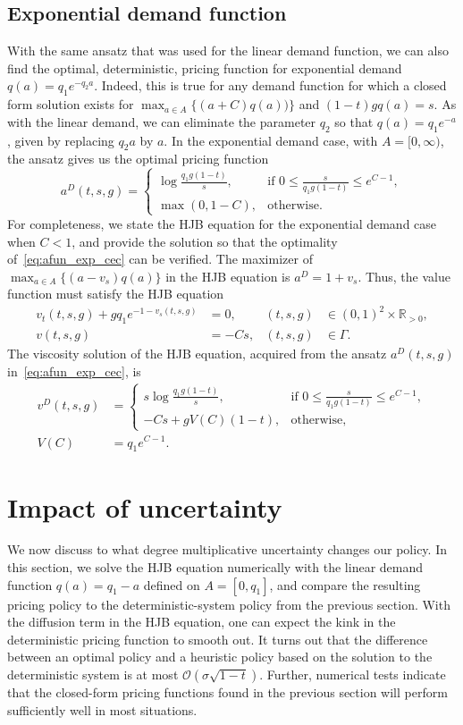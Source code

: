 \documentclass[main.tex]{subfiles}
\begin{document}
\subsection{Exponential demand function}
With the same ansatz that was used for the linear demand function, we
can also find the optimal, deterministic, pricing function for
exponential demand $q(a)=q_1e^{-q_2a}$.
Indeed, this is true for any demand function for which a closed form
solution exists for $\max_{a\in A}\{(a+C)q(a))\}$ and $(1-t)gq(a)=s$.
As with the linear demand, we can eliminate the parameter $q_2$ so that
$q(a)=q_1e^{-a}$, given by replacing $q_2a$ by $a$.
In the exponential demand case, with $A=[0,\infty)$, the ansatz gives
us the optimal pricing function
\begin{equation}\label{eq:afun_exp_cec}
  a^D(t,s,g)=\begin{cases}
    \log{\frac{q_1g(1-t)}{s}},
    &\text{if } 0\leq\frac{s}{q_1g(1-t)}\leq e^{C-1},\\
    \max\left(0,1-C\right),&\text{otherwise}.
  \end{cases}
\end{equation}
For completeness, we state the HJB equation for the exponential demand
case when $C<1$, and provide the solution so that the optimality of~\eqref{eq:afun_exp_cec} can
be verified. The maximizer of $\max_{a\in A}\{(a-v_s)q(a)\}$ in the
HJB equation is $a^D =  1+v_s$. Thus, the value function
must satisfy the HJB equation
\begin{align}
  v_t(t,s,g)
  +gq_1e^{-1-v_s(t,s,g)}
  &=0,&(t,s,g)&\in{(0,1)}^2\times \mathbb R_{>0},\\
  v(t,s,g) &= -Cs,&(t,s,g)&\in \Gamma.
\end{align}
The viscosity solution of the HJB equation, acquired from the ansatz $a^D(t,s,g)$
in~\eqref{eq:afun_exp_cec}, is
\begin{align}
  v^D(t,s,g)
  &=\begin{cases}
    s \log \frac{q_1g(1-t)}{s},
    &\text{if } 0\leq \frac{s}{q_1g(1-t)}\leq e^{C-1},\\
    -Cs+gV(C)(1-t),&\text{otherwise},
  \end{cases}\\
  V(C)&=q_1e^{C-1}.
\end{align}

\section{Impact of uncertainty}\label{sec:stochastic_hjb}
We now discuss to what degree multiplicative uncertainty changes
our policy. In this section, we solve the HJB equation numerically with the linear
demand function $q(a)=q_1-a$ defined on $A=[0,q_1]$, and compare the
resulting pricing policy to the
deterministic-system policy from the previous section.
With the diffusion term in the HJB equation, one can
expect the kink in the deterministic pricing function to smooth
out. It turns out that the difference between an optimal
policy and a heuristic policy based on the solution
to the deterministic system is at most
$\mathcal{O}(\sigma \sqrt{1-t})$. Further, numerical tests indicate that the
closed-form pricing functions found in the previous section will
perform sufficiently well in most situations.
\end{document}
